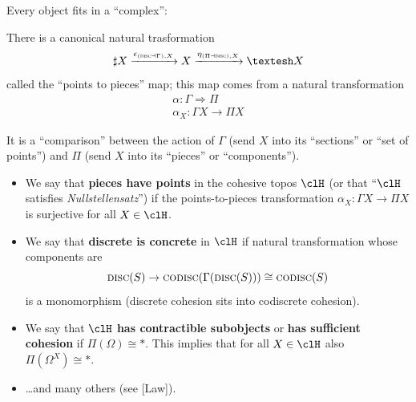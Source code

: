\documentclass[presentation]{beamer}
\begin{document}
\begin{frame}
		Every object fits in a ``complex'':%
	\onslide<+->
	\begin{df}
		There is a canonical natural trasformation
		\[
			\sharp X \xto{\epsilon_{(\disc\dashv\Gamma),X}} X \xto{\eta_{(\Pi\dashv\disc),X}} \shape X
		\]
		called the ``\alert{points to pieces}'' map; \onslide<+-> this map comes from a natural transformation
		\begin{gather*}
			\alpha : \Gamma \Rightarrow \Pi \\ \alpha_X : \Gamma X \to \Pi X
    \end{gather*}
	\end{df}
		It is a ``comparison'' between the action of $\Gamma$ (send $X$ into its ``sections'' or ``set of points'') and $\Pi$ (send $X$ into its ``pieces'' or ``components'').
\end{frame}
%
%
%
%
%
%
%
%
%
\begin{frame}
	\begin{itemize}
		\item<+-> We say that \textbf{pieces have points} in the cohesive topos $\clH$ (or that ``$\clH$ satisfies \emph{Nullstellensatz}'') if the points-to-pieces transformation $\alpha_X\colon \Gamma X \to \Pi X$ is surjective for all $X\in\clH$.
		\item<+-> We say that \textbf{discrete is concrete} in $\clH$ if natural transformation whose components are
		      \[
			      \textsc{disc}(S) \to \textsc{codisc}(\Gamma(\textsc{disc}(S))) \cong \textsc{codisc}(S)
		      \]
		      is a monomorphism (discrete cohesion sits into codiscrete cohesion).
		\item<+-> We say that $\clH$ \textbf{has contractible subobjects} or \textbf{has sufficient cohesion} if $\Pi(\Omega)\cong *$. This implies that for all $X\in\clH$ also $\Pi(\Omega^X)\cong *$.

		      \vspace*{\fill}
		\item<+-> \dots and many others (see [Law]).
	\end{itemize}
\end{frame}
%
%
%
%
%
%
%
%
%
\end{document}
